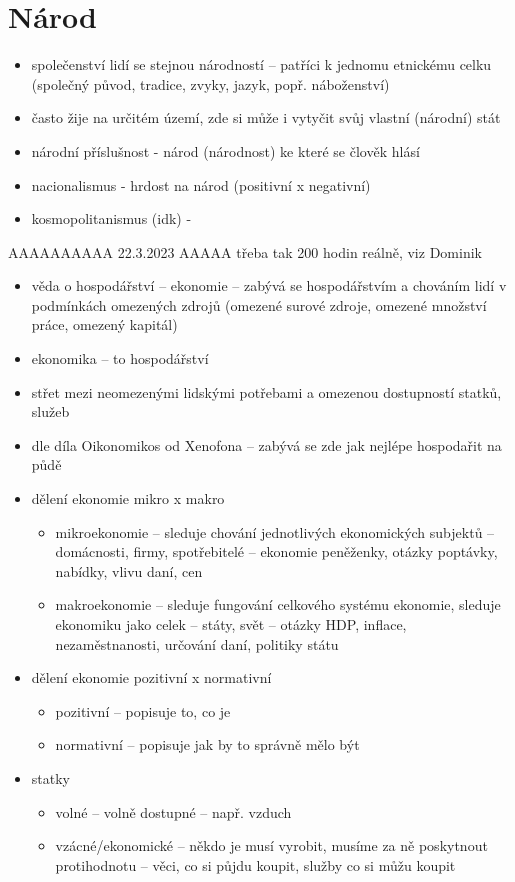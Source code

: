 \documentclass{article}
\begin{document}
\section{Národ}
\begin{itemize}
  \item společenství lidí se stejnou národností -- patříci k jednomu etnickému celku (společný původ, tradice, zvyky, jazyk, popř. náboženství)
  \item často žije na určitém území, zde si může i vytyčit svůj vlastní (národní) stát
  \item národní příslušnost - národ (národnost) ke které se člověk hlásí
  \item nacionalismus - hrdost na národ (positivní x negativní)
  \item kosmopolitanismus (idk) - 
\end{itemize}

AAAAAAAAAA 22.3.2023
AAAAA třeba tak 200 hodin reálně, viz Dominik

\begin{itemize}
  \item věda o hospodářství -- ekonomie -- zabývá se hospodářstvím a chováním lidí v podmínkách omezených zdrojů (omezené surové zdroje, omezené množství práce, omezený kapitál)
  \item ekonomika -- to hospodářství
  \item střet mezi neomezenými lidskými potřebami a omezenou dostupností statků, služeb
  \item dle díla Oikonomikos od Xenofona -- zabývá se zde jak nejlépe hospodařit na půdě
  \item dělení ekonomie mikro x makro
  \begin{itemize}
    \item mikroekonomie -- sleduje chování jednotlivých ekonomických subjektů -- domácnosti, firmy, spotřebitelé -- ekonomie peněženky, otázky poptávky, nabídky, vlivu daní, cen
    \item makroekonomie -- sleduje fungování celkového systému ekonomie, sleduje ekonomiku jako celek -- státy, svět -- otázky HDP, inflace, nezaměstnanosti, určování daní, politiky státu
  \end{itemize}
  \item dělení ekonomie pozitivní x normativní
  \begin{itemize}
    \item pozitivní -- popisuje to, co je
    \item normativní -- popisuje jak by to správně mělo být
  \end{itemize}
  \item statky
  \begin{itemize}
    \item volné -- volně dostupné -- např. vzduch
    \item vzácné/ekonomické -- někdo je musí vyrobit, musíme za ně poskytnout protihodnotu -- věci, co si půjdu koupit, služby co si můžu koupit
  \end{itemize}
\end{itemize}
\end{document}
